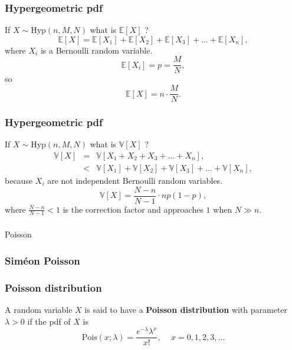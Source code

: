 \begin{frame}[fragile]\frametitle{Hypergeometric pdf}

If $X \sim \mbox{Hyp}(n,M,N)$ what is $\mathbb E[X]$ ?  
$$\mathbb E[X] = \mathbb E[X_1]+\mathbb E[X_2]+\mathbb E[X_3]+ ... + \mathbb E[X_n],$$
where $X_i$ is a Bernoulli random variable. \\ 
$$\mathbb E[X_i] = p = \frac{M}{N},$$
so
$$\mathbb E[X] = n \cdot \frac{M}{N}.$$ 

\end{frame}



\begin{frame}[fragile]\frametitle{Hypergeometric pdf}

If $X \sim \mbox{Hyp}(n,M,N)$ what is $\mathbb V[X]$ ?  
\begin{eqnarray*}
\mathbb V[X]& =& \mathbb V[X_1+X_2+X_3+ ... +X_n],\\
      & < &\mathbb V[X_1]+\mathbb V[X_2]+\mathbb V[X_3]+ ... + \mathbb V[X_n],
\end{eqnarray*}
because $X_i$ are not independent Bernoulli random variables. \\ 
$$\mathbb V[X] = \frac{N-n}{N-1} \cdot np(1-p) ,$$ 
where $\frac{N-n}{N-1} < 1$ is the correction factor and approaches 
$1$ when $N \gg n$.

\end{frame}


\begin{frame}[fragile]\frametitle{}
\begin{center}
{\Large Poisson}

\end{center}
\end{frame}



\begin{frame}[fragile]\frametitle{Sim\'eon Poisson}


\end{frame}



\begin{frame}[fragile]\frametitle{Poisson distribution}

\begin{defn}

A random variable $X$ is said to have a  {\bf Poisson distribution}
with parameter $\lambda >0$ if the pdf of $X$ is
$$\mbox{Pois}(x;\lambda) = \frac{e^{-\lambda} \lambda^x}{x!}, \, \, \,
\, \, \, \, x=0,1,2,3,...$$ 
\end{defn}


\end{frame}


